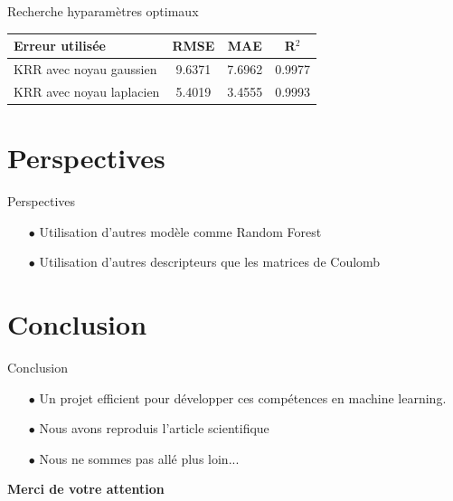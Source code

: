 \documentclass{beamer}
\begin{document}
\begin{frame}{Recherche hyparamètres optimaux}
\begin{center}
\begin{tabular}{ l| c c c }

   Erreur utilisée  & RMSE & MAE & R$^2$ \\
   \hline
   KRR avec noyau gaussien & 9.6371 & 7.6962 & 0.9977\\
   KRR avec noyau laplacien  & 5.4019 & 3.4555 & 0.9993\\
  \end{tabular}
  \end{center}
\end{frame}
\section{Perspectives}
\begin{frame}{Perspectives}
\begin{itemize}
\item[$\bullet$] Utilisation d'autres modèle comme Random Forest
\newline
\item[$\bullet$]Utilisation d'autres descripteurs que les matrices de Coulomb
\end{itemize}
\end{frame}
\section{Conclusion}

\begin{frame}{Conclusion}
\begin{itemize}
\item[$\bullet$] Un projet efficient pour développer ces compétences en machine learning.
\newline
\item[$\bullet$] Nous avons reproduis l'article scientifique
\item[$\bullet$] Nous ne sommes pas allé plus loin...
\end{itemize}
\end{frame}

\begin{frame}
\begin{center}
\textbf{Merci de votre attention}
\end{center}
\end{frame}
\end{document}
